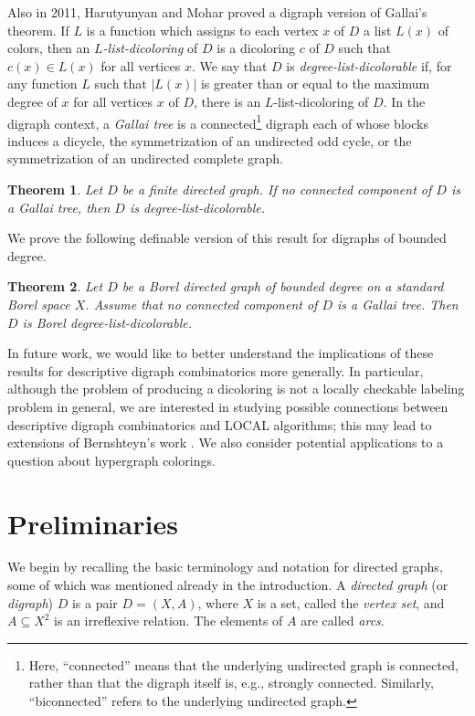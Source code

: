\documentclass[psamsfonts]{amsart}
\newtheorem{thm}{Theorem}[section]
\theoremstyle{definition}
\theoremstyle{remark}
\numberwithin{equation}{section}
\begin{document}
Also in 2011, Harutyunyan and Mohar proved a digraph version of Gallai's theorem. If $L$ is a function which assigns to each vertex $x$ of $D$ a list $L(x)$ of colors, then an {\it $L$-list-dicoloring} of $D$ is a dicoloring $c$ of $D$ such that $c(x) \in L(x)$ for all vertices $x$. We say that $D$ is {\it degree-list-dicolorable} if, for any function $L$ such that $\vert L(x) \vert$ is greater than or equal to the maximum degree of $x$ for all vertices $x$ of $D$, there is an $L$-list-dicoloring of $D$. In the digraph context, a {\it Gallai tree} is a connected\footnote{Here, ``connected'' means that the underlying undirected graph is connected, rather than that the digraph itself is, e.g., strongly connected. Similarly, ``biconnected'' refers to the underlying undirected graph.} digraph each of whose blocks induces a dicycle, the symmetrization of an undirected odd cycle, or the symmetrization of an undirected complete graph.

\begin{thm}
    \cite[Theorem~2.1]{hm2011} Let $D$ be a finite directed graph. If no connected component of $D$ is a Gallai tree, then $D$ is degree-list-dicolorable.
\end{thm}

We prove the following definable version of this result for digraphs of bounded degree.

\begin{thm}
\label{thm:digallai}
    Let $D$ be a Borel directed graph of bounded degree on a standard Borel space $X$. Assume that no connected component of $D$ is a Gallai tree. Then $D$ is Borel degree-list-dicolorable.
\end{thm}

In future work, we would like to better understand the implications of these results for descriptive digraph combinatorics more generally. In particular, although the problem of producing a dicoloring is not a locally checkable labeling problem in general, we are interested in studying possible connections between descriptive digraph combinatorics and \textsf{LOCAL} algorithms; this may lead to extensions of Bernshteyn's work \cite{bernshteyn2023}. We also consider potential applications to a question about hypergraph colorings.

\section{Preliminaries}
We begin by recalling the basic terminology and notation for directed graphs, some of which was mentioned already in the introduction. A {\it directed graph} (or {\it digraph}) $D$ is a pair $D = (X, A)$, where $X$ is a set, called the {\it vertex set}, and $A \subseteq X^2$ is an irreflexive relation. The elements of $A$ are called {\it arcs}.
\end{document}
